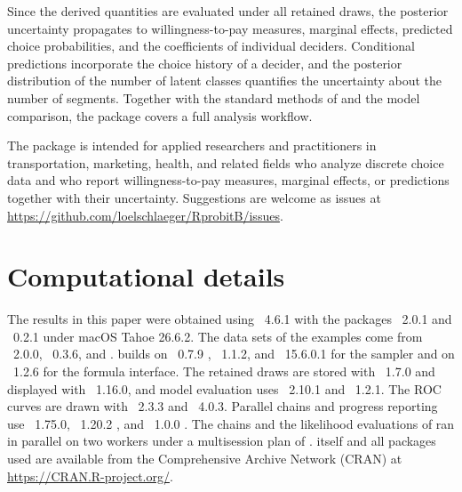 \documentclass[article,shortnames]{jss}
\newcommand{\fct}[1]{\code{#1()}}
\begin{document}
Since the derived quantities are evaluated under all retained draws, the
posterior uncertainty propagates to willingness-to-pay measures, marginal
effects, predicted choice probabilities, and the coefficients of individual
deciders. Conditional predictions incorporate the choice history of a decider,
and the posterior distribution of the number of latent classes quantifies the
uncertainty about the number of segments. Together with the standard methods of
 and the model comparison, the package covers a full analysis
workflow.

The package is intended for applied researchers and practitioners in
transportation, marketing, health, and related fields who analyze discrete
choice data and who report willingness-to-pay measures, marginal effects, or
predictions together with their uncertainty. Suggestions are welcome as issues
at \url{https://github.com/loelschlaeger/RprobitB/issues}.

\section*{Computational details}

The results in this paper were obtained using
~4.6.1
with the packages ~2.0.1 and
~0.2.1 under
macOS Tahoe 26.6.2. The data sets of the examples come from
~2.0.0,
~0.3.6, and .
 builds on ~0.7.9
\citep{Oelschlaeger2026b}, ~1.1.2, and
~15.6.0.1 for the sampler and
on ~1.2.6 for the formula interface.
The retained draws are stored with
~1.7.0 and displayed with
~1.16.0, and model evaluation uses
~2.10.1 and
~1.2.1. The ROC curves
are drawn with ~2.3.3 and
~4.0.3. Parallel chains and progress
reporting use ~1.75.0,
~1.20.2
\citep{Bengtsson2026b}, and ~1.0.0
\citep{Bengtsson2026}. The chains and the likelihood evaluations of \fct{loo}
ran in parallel on two workers under a multisession plan of .
 itself and all packages used are available from the Comprehensive
 Archive Network (CRAN) at \url{https://CRAN.R-project.org/}.



\end{document}
